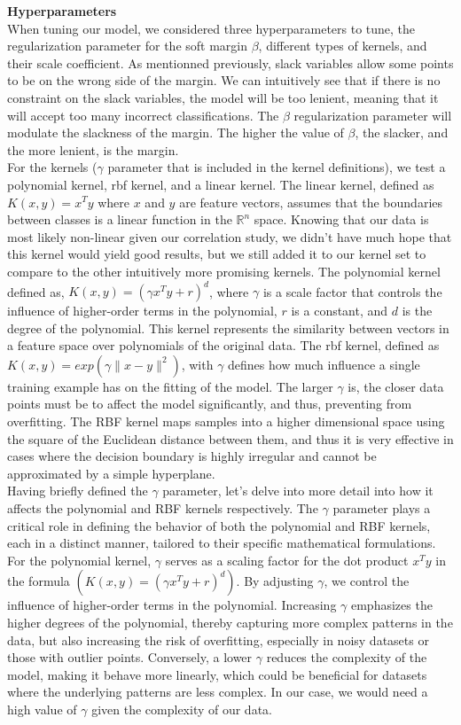 \documentclass[twocolumn]{article}
\newcommand{\R}{\mathbb{R}}
\begin{document}
\textbf{Hyperparameters}\\
When tuning our model, we considered three hyperparameters to tune, the regularization parameter for the soft margin $\beta$, different types of kernels, and their scale coefficient. As mentionned previously, slack variables allow some points to be on the wrong side of the margin. We can intuitively see that if there is no constraint on the slack variables, the model will be too lenient, meaning that it will accept too many incorrect classifications. The $\beta$ regularization parameter will modulate the slackness of the margin. The higher the value of $\beta$, the slacker, and the more lenient, is the margin. \\
For the kernels ($\gamma$ parameter that is included in the kernel definitions), we test a polynomial kernel, rbf kernel, and a linear kernel. The linear kernel, defined as $K(x, y) = x^T y$ where $x$ and $y$ are feature vectors, assumes that the boundaries between classes is a linear function in the $\R^n$ space. Knowing that our data is most likely non-linear given our correlation study, we didn't have much hope that this kernel would yield good results, but we still added it to our kernel set to compare to the other intuitively more promising kernels. The polynomial kernel defined as, $K(x, y) = (\gamma x^T y + r )^d$, where $\gamma$ is a scale factor that controls the influence of higher-order terms in the polynomial, $r$ is a constant, and $d$ is the degree of the polynomial. This kernel represents the similarity between vectors in a feature space over polynomials of the original data. The rbf kernel, defined as $K(x, y) = exp(\gamma \| x - y \|^2)$, with $\gamma$ defines how much influence a single training example has on the fitting of the model. The larger $\gamma$ is, the closer data points must be to affect the model significantly, and thus, preventing from overfitting. The RBF kernel maps samples into a higher dimensional space using the square of the Euclidean distance between them, and thus it is very effective in cases where the decision boundary is highly irregular and cannot be approximated by a simple hyperplane. \\
Having briefly defined the $\gamma$ parameter, let's delve into more detail into how it affects the polynomial and RBF kernels respectively. The $\gamma$ parameter plays a critical role in defining the behavior of both the polynomial and RBF kernels, each in a distinct manner, tailored to their specific mathematical formulations.
For the polynomial kernel, $\gamma$ serves as a scaling factor for the dot product \(x^T y\) in the formula $(K(x, y) = (\gamma x^T y + r)^d)$. By adjusting $\gamma$, we control the influence of higher-order terms in the polynomial. Increasing $\gamma$ emphasizes the higher degrees of the polynomial, thereby capturing more complex patterns in the data, but also increasing the risk of overfitting, especially in noisy datasets or those with outlier points. Conversely, a lower $\gamma$ reduces the complexity of the model, making it behave more linearly, which could be beneficial for datasets where the underlying patterns are less complex. In our case, we would need a high value of $\gamma$ given the complexity of our data.
\end{document}
